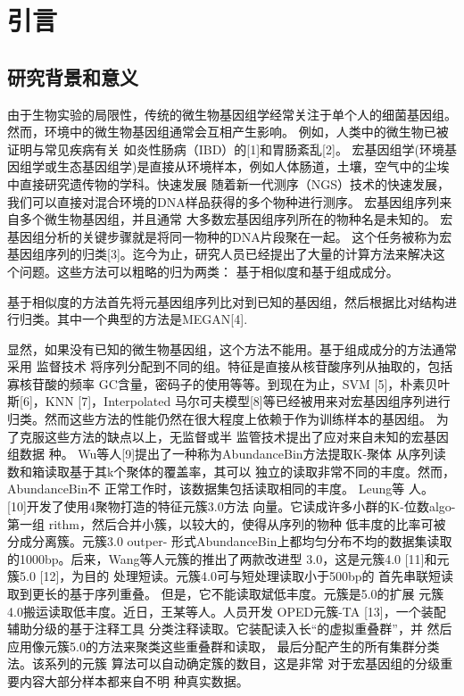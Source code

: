 ﻿\chapter{引言}
\section{研究背景和意义}

由于生物实验的局限性，传统的微生物基因组学经常关注于单个人的细菌基因组。然而，环境中的微生物基因组通常会互相产生影响。
例如，人类中的微生物已被证明与常见疾病有关
如炎性肠病（IBD）的[1]和胃肠紊乱[2]。
宏基因组学(环境基因组学或生态基因组学)是直接从环境样本，例如人体肠道，土壤，空气中的尘埃中直接研究遗传物的学科。快速发展
随着新一代测序（NGS）技术的快速发展，我们可以直接对混合环境的DNA样品获得的多个物种进行测序。
宏基因组序列来自多个微生物基因组，并且通常
大多数宏基因组序列所在的物种名是未知的。
宏基因组分析的关键步骤就是将同一物种的DNA片段聚在一起。
这个任务被称为宏基因组序列的归类[3]。迄今为止，研究人员已经提出了大量的计算方法来解决这个问题。这些方法可以粗略的归为两类：
基于相似度和基于组成成分。

基于相似度的方法首先将元基因组序列比对到已知的基因组，然后根据比对结构进行归类。其中一个典型的方法是MEGAN[4].

显然，如果没有已知的微生物基因组，这个方法不能用。基于组成成分的方法通常采用
监督技术 将序列分配到不同的组。特征是直接从核苷酸序列从抽取的，包括寡核苷酸的频率
GC含量，密码子的使用等等。到现在为止，SVM [5]，朴素贝叶斯[6]，KNN [7]，Interpolated 马尔可夫模型[8]等已经被用来对宏基因组序列进行归类。然而这些方法的性能仍然在很大程度上依赖于作为训练样本的基因组。
为了克服这些方法的缺点以上，无监督或半
监管技术提出了应对来自未知的宏基因组数据
种。 Wu等人[9]提出了一种称为AbundanceBin方法提取K-聚体
从序列读数和箱读取基于其k个聚体的覆盖率，其可以
独立的读取非常不同的丰度。然而，AbundanceBin不
正常工作时，该数据集包括读取相同的丰度。 Leung等
人。 [10]开发了使用4聚物打造的特征元簇3.0方法
向量。它读成许多小群的K-位数algo-第一组
rithm，然后合并小簇，以较大的，使得从序列的物种
低丰度的比率可被分成分离簇。元簇3.0 outper-
形式AbundanceBin上都均匀分布不均的数据集读取
的1000bp。后来，Wang等人元簇的推出了两款改进型
3.0，这是元簇4.0 [11]和元簇5.0 [12]，为目的
处理短读。元簇4.0可与短处理读取小于500bp的
首先串联短读取到更长的基于序列重叠。
但是，它不能读取斌低丰度。元簇是5.0的扩展
元簇4.0搬运读取低丰度。近日，王某等人。人员开发
OPED元簇-TA [13]，一个装配辅助分级的基于注释工具
分类注释读取。它装配读入长“的虚拟重叠群”，并
然后应用像元簇5.0的方法来聚类这些重叠群和读取，
最后分配产生的所有集群分类法。该系列的元簇
算法可以自动确定簇的数目，这是非常
对于宏基因组的分级重要内容大部分样本都来自不明
种真实数据。

